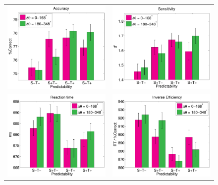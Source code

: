 \documentclass[dwyatte_dissertation.tex]{subfiles}
\begin{document}
\begin{figure}[h!]
\begin{center}
\begin{tabular}{ll}
\includegraphics[width=80mm]{figs/chap_pleast/results_accuracy_angle.pdf} & 
\includegraphics[width=80mm]{figs/chap_pleast/results_dprime_angle.pdf} \\
\includegraphics[width=80mm]{figs/chap_pleast/results_rt_angle.pdf} & 
\includegraphics[width=80mm]{figs/chap_pleast/results_ie_angle.pdf} \\

\end{tabular}
\end{center}
\end{figure}
\end{document}
